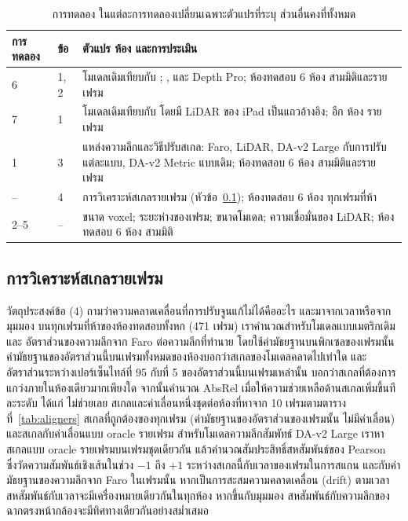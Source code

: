 \begin{table}[t]
\centering\small
\caption{การทดลอง ในแต่ละการทดลองเปลี่ยนเฉพาะตัวแปรที่ระบุ ส่วนอื่นคงที่ทั้งหมด}
\label{tab:exps}
\begin{tabularx}{\columnwidth}{@{}ll>{\raggedright\arraybackslash}X@{}}
\toprule
การทดลอง & ข้อ & ตัวแปร ห้อง และการประเมิน \\
\midrule
6 & 1, 2 & โมเดลเดิมเทียบกับ \ftmain{}; \ftfaro{}, \ftlidar{} และ Depth Pro; ห้องทดสอบ 6 ห้อง สามมิติและรายเฟรม \\
7 & 1 & โมเดลเดิมเทียบกับ \ftmain{} โดยมี LiDAR ของ iPad เป็นแถวอ้างอิง; อีก \rsVN{} ห้อง รายเฟรม \\
1 & 3 & แหล่งความลึกและวิธีปรับสเกล: Faro, LiDAR, \mbox{DA-v2} Large กับการปรับแต่ละแบบ, \mbox{DA-v2} Metric แบบเดิม;
ห้องทดสอบ 6 ห้อง สามมิติและรายเฟรม \\
-- & 4 & การวิเคราะห์สเกลรายเฟรม (หัวข้อ~\ref{sec:scaleanalysis}); ห้องทดสอบ 6 ห้อง ทุกเฟรมที่ห้า \\
2--5 & -- & ขนาด voxel; ระยะห่างของเฟรม; ขนาดโมเดล; ความเชื่อมั่นของ LiDAR; ห้องทดสอบ 6 ห้อง สามมิติ \\
\bottomrule
\end{tabularx}
\end{table}

\subsection{การวิเคราะห์สเกลรายเฟรม}\label{sec:scaleanalysis}
วัตถุประสงค์ข้อ (4) ถามว่าความคลาดเคลื่อนที่การปรับจูนแก้ไม่ได้คืออะไร และมาจากเวลาหรือจากมุมมอง
บนทุกเฟรมที่ห้าของห้องทดสอบทั้งหก (471 เฟรม) เราคำนวณสำหรับโมเดลแบบเมตริกเดิมและ \ftmain{}
อัตราส่วนของความลึกจาก Faro ต่อความลึกที่ทำนาย โดยใช้ค่ามัธยฐานบนพิกเซลของเฟรมนั้น
ค่ามัธยฐานของอัตราส่วนนี้บนเฟรมทั้งหมดของห้องบอกว่าสเกลของโมเดลคลาดไปเท่าใด
และอัตราส่วนระหว่างเปอร์เซ็นไทล์ที่ 95 กับที่ 5 ของอัตราส่วนนี้บนเฟรมเหล่านั้น บอกว่าสเกลที่ต้องการแกว่งภายในห้องเดียวมากเพียงใด
จากนั้นคำนวณ AbsRel เมื่อให้ความช่วยเหลือด้านสเกลเพิ่มขึ้นทีละระดับ ได้แก่ ไม่ช่วยเลย
สเกลและค่าเลื่อนหนึ่งชุดต่อห้องที่หาจาก 10 เฟรมตามตารางที่~\ref{tab:aligners}
สเกลที่ถูกต้องของทุกเฟรม (ค่ามัธยฐานของอัตราส่วนของเฟรมนั้น ไม่มีค่าเลื่อน) และสเกลกับค่าเลื่อนแบบ oracle รายเฟรม
สำหรับโมเดลความลึกสัมพัทธ์ \mbox{DA-v2} Large เราหาสเกลแบบ oracle รายเฟรมบนเฟรมชุดเดียวกัน
แล้วคำนวณสัมประสิทธิ์สหสัมพันธ์ของ Pearson~\cite{pearson} ซึ่งวัดความสัมพันธ์เชิงเส้นในช่วง $-1$ ถึง $+1$
ระหว่างสเกลนี้กับเวลาของเฟรมในการสแกน และกับค่ามัธยฐานของความลึกจาก Faro ในเฟรมนั้น
หากเป็นการสะสมความคลาดเคลื่อน (drift) ตามเวลา สหสัมพันธ์กับเวลาจะมีเครื่องหมายเดียวกันในทุกห้อง
หากขึ้นกับมุมมอง สหสัมพันธ์กับความลึกของฉากตรงหน้ากล้องจะมีทิศทางเดียวกันอย่างสม่ำเสมอ
